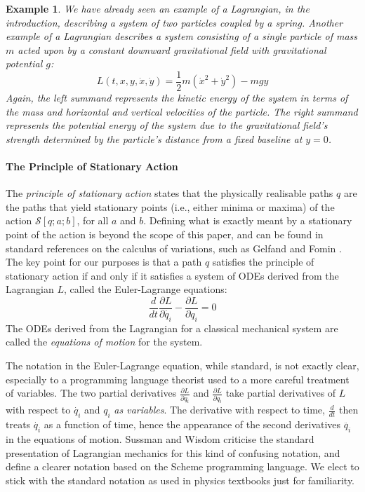 \documentclass[preprint]{sigplanconf}
\theoremstyle{examplestyle}
\newtheorem{example}{Example}
\begin{document}
\begin{example}
  We have already seen an example of a Lagrangian, in the
  introduction, describing a system of two particles coupled by a
  spring. Another example of a Lagrangian describes a system
  consisting of a single particle of mass $m$ acted upon by a constant
  downward gravitational field with gravitational potential $g$:
  \begin{equation}\label{eq:simple-g-lagrangian}
    L(t,x,y,\dot{x},\dot{y}) = \frac{1}{2}m(\dot{x}^2 + \dot{y}^2) - mgy
  \end{equation}
  Again, the left summand represents the kinetic energy of the system
  in terms of the mass and horizontal and vertical velocities of the
  particle. The right summand represents the potential energy of the
  system due to the gravitational field's strength determined by the
  particle's distance from a fixed baseline at $y = 0$.
\end{example}

\paragraph{The Principle of Stationary Action}

The \emph{principle of stationary action} states that the physically
realisable paths $q$ are the paths that yield stationary points (i.e.,
either minima or maxima) of the action $\mathcal{S}[q;a;b]$, for all
$a$ and $b$. Defining what is exactly meant by a stationary point of
the action is beyond the scope of this paper, and can be found in
standard references on the calculus of variations, such as Gelfand and
Fomin \cite{gelfand00calculus}. The key point for our purposes is that
a path $q$ satisfies the principle of stationary action if and only if
it satisfies a system of ODEs derived from the Lagrangian $L$, called
the Euler-Lagrange equations:
\begin{equation}\label{eq:euler-lagrange}
  \frac{d}{dt}\frac{\partial L}{\partial \dot{q_i}} - \frac{\partial L}{\partial q_i} = 0
\end{equation}
The ODEs derived from the Lagrangian for a classical mechanical system
are called the \emph{equations of motion} for the system.

The notation in the Euler-Lagrange equation, while standard, is not
exactly clear, especially to a programming language theorist used to a
more careful treatment of variables. The two partial derivatives
$\frac{\partial L}{\partial \dot{q_i}}$ and $\frac{\partial
  L}{\partial q_i}$ take partial derivatives of $L$ with respect to
$\dot{q_i}$ and $q_i$ \emph{as variables}. The derivative with respect
to time, $\frac{d}{dt}$ then treats $\dot{q_i}$ as a function of time,
hence the appearance of the second derivatives $\ddot{q_i}$ in the
equations of motion. Sussman and Wisdom \cite{sussman01structure}
criticise the standard presentation of Lagrangian mechanics for this
kind of confusing notation, and define a clearer notation based on the
Scheme programming language. We elect to stick with the standard
notation as used in physics textbooks just for familiarity.
\end{document}
